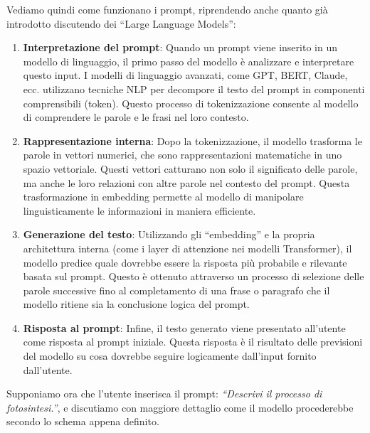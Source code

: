             Vediamo quindi come funzionano i prompt, riprendendo anche quanto già introdotto discutendo dei ``Large Language Models'':

            \begin{enumerate}
                \item \textbf{Interpretazione del prompt}: Quando un prompt viene inserito in un modello di linguaggio, il primo passo del modello è analizzare e interpretare questo input. I modelli di linguaggio avanzati, come GPT, BERT, Claude, ecc. utilizzano tecniche NLP per decompore il testo del prompt in componenti comprensibili (token). Questo processo di tokenizzazione consente al modello di comprendere le parole e le frasi nel loro contesto.
                
                \item \textbf{Rappresentazione interna}: Dopo la tokenizzazione, il modello trasforma le parole in vettori numerici, che sono rappresentazioni matematiche in uno spazio vettoriale. Questi vettori catturano non solo il significato delle parole, ma anche le loro relazioni con altre parole nel contesto del prompt. Questa trasformazione in embedding permette al modello di manipolare linguisticamente le informazioni in maniera efficiente.
                
                \item \textbf{Generazione del testo}: Utilizzando gli ``embedding'' e la propria architettura interna (come i layer di attenzione nei modelli Transformer), il modello predice quale dovrebbe essere la risposta più probabile e rilevante basata sul prompt. Questo è ottenuto attraverso un processo di selezione delle parole successive fino al completamento di una frase o paragrafo che il modello ritiene sia la conclusione logica del prompt.
                
                \item \textbf{Risposta al prompt}: Infine, il testo generato viene presentato all'utente come risposta al prompt iniziale. Questa risposta è il risultato delle previsioni del modello su cosa dovrebbe seguire logicamente dall'input fornito dall'utente.
            \end{enumerate}
                
            Supponiamo ora che l'utente inserisca il prompt: \textit{``Descrivi il processo di fotosintesi.''}, e discutiamo con maggiore dettaglio come il modello procederebbe secondo lo schema appena definito.
            
